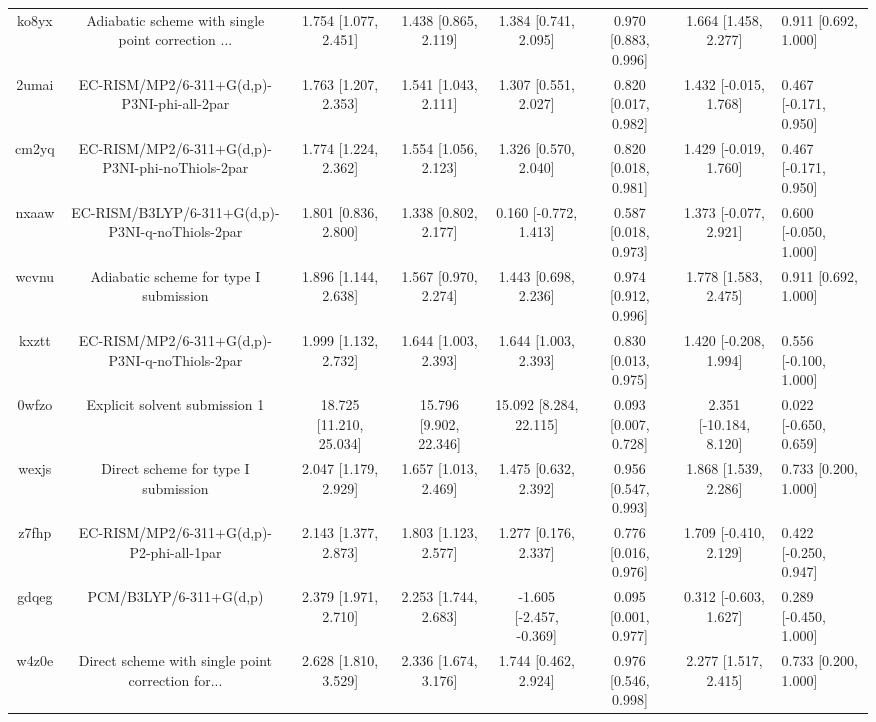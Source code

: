 \documentclass{article}
\begin{document}
\begin{center}
\begin{longtable}{|ccccccc|}
 ko8yx &  Adiabatic scheme with single point correction ... &     1.754 [1.077, 2.451] &     1.438 [0.865, 2.119] &     1.384 [0.741, 2.095] &  0.970 [0.883, 0.996] &    1.664 [1.458, 2.277] &   0.911 [0.692, 1.000] \\
 2umai &         EC-RISM/MP2/6-311+G(d,p)-P3NI-phi-all-2par &     1.763 [1.207, 2.353] &     1.541 [1.043, 2.111] &     1.307 [0.551, 2.027] &  0.820 [0.017, 0.982] &   1.432 [-0.015, 1.768] &  0.467 [-0.171, 0.950] \\
 cm2yq &    EC-RISM/MP2/6-311+G(d,p)-P3NI-phi-noThiols-2par &     1.774 [1.224, 2.362] &     1.554 [1.056, 2.123] &     1.326 [0.570, 2.040] &  0.820 [0.018, 0.981] &   1.429 [-0.019, 1.760] &  0.467 [-0.171, 0.950] \\
 nxaaw &    EC-RISM/B3LYP/6-311+G(d,p)-P3NI-q-noThiols-2par &     1.801 [0.836, 2.800] &     1.338 [0.802, 2.177] &    0.160 [-0.772, 1.413] &  0.587 [0.018, 0.973] &   1.373 [-0.077, 2.921] &  0.600 [-0.050, 1.000] \\
 wcvnu &             Adiabatic scheme for type I submission &     1.896 [1.144, 2.638] &     1.567 [0.970, 2.274] &     1.443 [0.698, 2.236] &  0.974 [0.912, 0.996] &    1.778 [1.583, 2.475] &   0.911 [0.692, 1.000] \\
 kxztt &      EC-RISM/MP2/6-311+G(d,p)-P3NI-q-noThiols-2par &     1.999 [1.132, 2.732] &     1.644 [1.003, 2.393] &     1.644 [1.003, 2.393] &  0.830 [0.013, 0.975] &   1.420 [-0.208, 1.994] &  0.556 [-0.100, 1.000] \\
 0wfzo &                      Explicit solvent submission 1 &  18.725 [11.210, 25.034] &   15.796 [9.902, 22.346] &   15.092 [8.284, 22.115] &  0.093 [0.007, 0.728] &  2.351 [-10.184, 8.120] &  0.022 [-0.650, 0.659] \\
 wexjs &                Direct scheme for type I submission &     2.047 [1.179, 2.929] &     1.657 [1.013, 2.469] &     1.475 [0.632, 2.392] &  0.956 [0.547, 0.993] &    1.868 [1.539, 2.286] &   0.733 [0.200, 1.000] \\
 z7fhp &           EC-RISM/MP2/6-311+G(d,p)-P2-phi-all-1par &     2.143 [1.377, 2.873] &     1.803 [1.123, 2.577] &     1.277 [0.176, 2.337] &  0.776 [0.016, 0.976] &   1.709 [-0.410, 2.129] &  0.422 [-0.250, 0.947] \\
 gdqeg &                             PCM/B3LYP/6-311+G(d,p) &     2.379 [1.971, 2.710] &     2.253 [1.744, 2.683] &  -1.605 [-2.457, -0.369] &  0.095 [0.001, 0.977] &   0.312 [-0.603, 1.627] &  0.289 [-0.450, 1.000] \\
 w4z0e &  Direct scheme with single point correction for... &     2.628 [1.810, 3.529] &     2.336 [1.674, 3.176] &     1.744 [0.462, 2.924] &  0.976 [0.546, 0.998] &    2.277 [1.517, 2.415] &   0.733 [0.200, 1.000] \\

\end{longtable}
\end{center}
\end{document}
